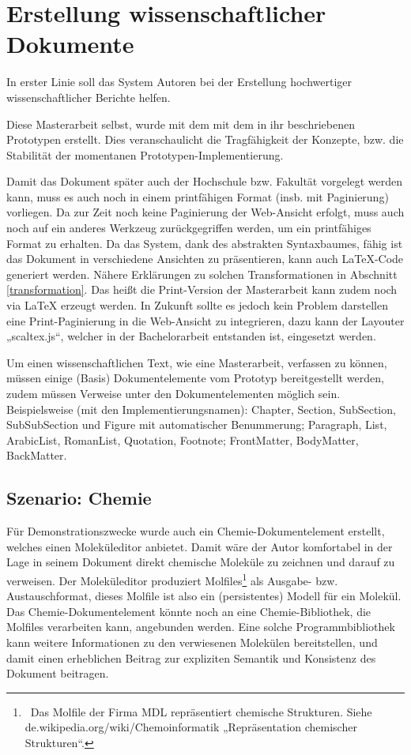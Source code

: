 \section{Erstellung wissenschaftlicher Dokumente}\label{wiss-dok-abschnitt}
 
In erster Linie soll das System Autoren bei der Erstellung hochwertiger wissenschaftlicher Berichte helfen.

 
Diese Masterarbeit selbst, wurde mit dem mit dem in ihr beschriebenen Prototypen erstellt. Dies veranschaulicht die Tragfähigkeit der Konzepte, bzw. die Stabilität der momentanen Prototypen-Implementierung.

 
Damit das Dokument später auch der Hochschule bzw. Fakultät vorgelegt werden kann, muss es auch noch in einem printfähigen Format (insb. mit Paginierung) vorliegen.  Da zur Zeit noch keine Paginierung der Web-Ansicht erfolgt, muss auch noch auf ein anderes Werkzeug zurückgegriffen werden, um ein printfähiges Format zu erhalten. Da das System, dank des abstrakten Syntaxbaumes, fähig ist das Dokument in verschiedene Ansichten zu präsentieren, kann auch LaTeX-Code generiert werden.  Nähere Erklärungen zu solchen Transformationen in Abschnitt \ref{transformation}. Das heißt die Print-Version der Masterarbeit kann zudem noch via LaTeX erzeugt werden. In Zukunft sollte es jedoch kein Problem darstellen eine Print-Paginierung in die Web-Ansicht zu integrieren, dazu kann der Layouter „scaltex.js“, welcher in der Bachelorarbeit \citep{Hodapp} entstanden ist, eingesetzt werden.

 
Um einen wissenschaftlichen Text, wie eine Masterarbeit, verfassen zu können, müssen einige (Basis) Dokumentelemente vom Prototyp bereitgestellt werden, zudem müssen Verweise unter den Dokumentelementen möglich sein. Beispielsweise (mit den Implementierungsnamen): Chapter, Section, SubSection, SubSubSection und Figure mit automatischer Benummerung; Paragraph, List, ArabicList, RomanList, Quotation, Footnote; FrontMatter, BodyMatter, BackMatter.

 
\subsection{Szenario: Chemie}\label{chemie-szenario}
 
Für Demonstrationszwecke wurde auch ein Chemie-Dokumentelement erstellt, welches einen Moleküleditor anbietet. Damit wäre der Autor komfortabel in der Lage in seinem Dokument direkt chemische Moleküle zu zeichnen und darauf zu verweisen. Der Moleküleditor produziert Molfiles\footnote{~Das Molfile der Firma MDL repräsentiert chemische Strukturen. Siehe de.wikipedia.org/wiki/Chemoinformatik „Repräsentation chemischer Strukturen“.} als Ausgabe- bzw. Austauschformat, dieses Molfile ist also ein (persistentes) Modell für ein Molekül. Das Chemie-Dokumentelement könnte noch an eine Chemie-Bibliothek, die Molfiles verarbeiten kann, angebunden werden. Eine solche Programmbibliothek kann weitere Informationen zu den verwiesenen Molekülen bereitstellen, und damit einen erheblichen Beitrag zur expliziten Semantik und Konsistenz des Dokument beitragen.

